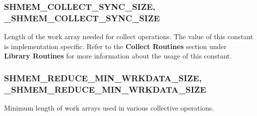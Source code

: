 \subsubsection{SHMEM\_COLLECT\_SYNC\_SIZE, \_SHMEM\_COLLECT\_SYNC\_SIZE }

Length of the work array needed for collect operations. The value
of this constant is implementation specific. Refer to the \textbf{Collect
Routines} section under \textbf{Library Routines} for more information
about the usage of this constant.


\subsubsection{SHMEM\_REDUCE\_MIN\_WRKDATA\_SIZE, \_SHMEM\_REDUCE\_MIN\_WRKDATA\_SIZE }

Minimum length of work arrays used in various collective operations.
